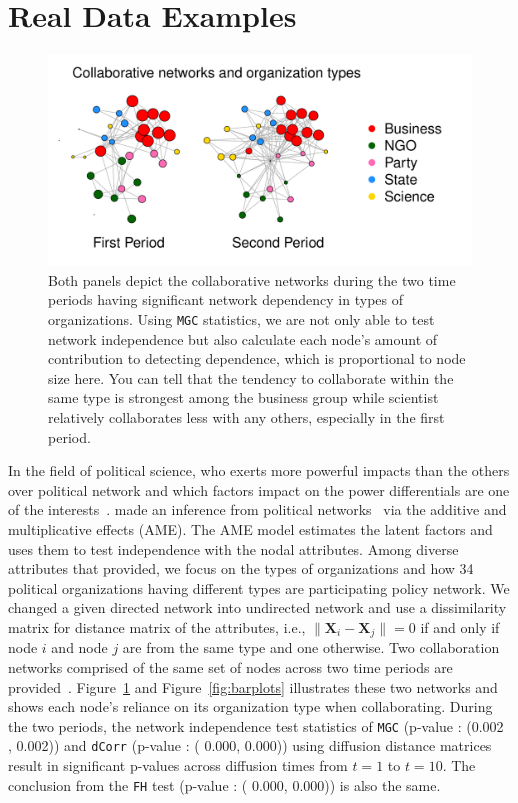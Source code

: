 \documentclass[11pt]{article}
\theoremstyle{definition}
\begin{document}
\section{Real Data Examples}
\label{sec:real}
\begin{figure}[ht]
	\centering
	\includegraphics[width=\linewidth]{../Figure/two_politics.pdf}
	\caption{Both panels depict the collaborative networks during the two time periods having significant network dependency in types of organizations. Using \texttt{MGC} statistics, we are not only able to test network independence but also calculate each node's amount of contribution to detecting dependence, which is proportional to node size here. You can tell that the tendency to collaborate within the same type is strongest among the business group while scientist relatively collaborates less with any others, especially in the first period.}
	\label{fig:politics}
\end{figure}
In the field of political science, who exerts more powerful impacts than the others over political network and which factors impact on the power differentials are one of the interests~\citep{ingold2014structural}. \cite{minhas2016inferential} made an inference from political networks~\citep{cranmer2016navigating} via the additive and multiplicative effects (AME). The AME model estimates the latent factors and uses them to test independence with the nodal attributes. Among diverse attributes that \cite{cranmer2016navigating} provided, we focus on the types of organizations and how 34 political organizations having different types are participating policy network. We changed a given directed network into undirected network and use a dissimilarity matrix for distance matrix of the attributes, i.e., $\parallel \mathbf{X}_{i}  - \mathbf{X}_{j} \parallel = 0$ if and only if node $i$ and node $j$ are from the same type and one otherwise. Two collaboration networks comprised of the same set of nodes across two time periods are provided~\citep{ingold2014structural}. Figure~\ref{fig:politics} and Figure~\ref{fig:barplots} illustrates these two networks and shows each node's reliance on its organization type when collaborating. During the two periods, the network independence test statistics of \texttt{MGC} (p-value : (0.002 , 0.002)) and \texttt{dCorr} (p-value : ( 0.000, 0.000)) using diffusion distance matrices result in significant p-values across diffusion times from $t=1$ to $t=10$. The conclusion from the \texttt{FH} test (p-value : ( 0.000, 0.000)) is also the same.  
\end{document}

